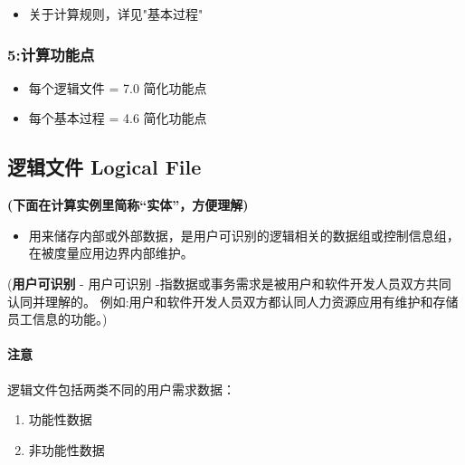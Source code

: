 \begin{itemize}
\tightlist
\item
  关于计算规则，详见"基本过程"
\end{itemize}

\hypertarget{ux8ba1ux7b97ux529fux80fdux70b9}{%
\subsubsection{5:计算功能点}\label{ux8ba1ux7b97ux529fux80fdux70b9}}

\begin{itemize}
\tightlist
\item
  每个逻辑文件 = 7.0 简化功能点
\item
  每个基本过程 = 4.6 简化功能点
\end{itemize}

\hypertarget{ux903bux8f91ux6587ux4ef6-logical-file}{%
\subsection{逻辑文件 Logical
File}\label{ux903bux8f91ux6587ux4ef6-logical-file}}

\textbf{(下面在计算实例里简称``实体''，方便理解)}

\begin{itemize}
\tightlist
\item
  用来储存内部或外部数据，是用户可识别的逻辑相关的数据组或控制信息组，在被度量应用边界内部维护。
\end{itemize}

\begin{description}
\tightlist
\item[]
(\textbf{用户可识别} -
用户可识别 -指数据或事务需求是被用户和软件开发人员双方共同认同并理解的。
例如:用户和软件开发人员双方都认同人力资源应用有维护和存储员工信息的功能。)
\end{description}

\hypertarget{ux6ce8ux610f}{%
\paragraph{注意}\label{ux6ce8ux610f}}

逻辑文件包括两类不同的用户需求数据：

\begin{enumerate}
\tightlist
\item
  功能性数据
\item
  非功能性数据
\end{enumerate}

